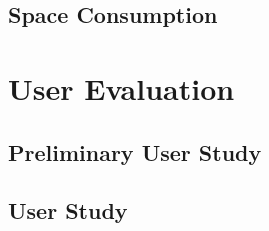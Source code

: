 \subsection{Space Consumption}

\section{User Evaluation}
\subsection{Preliminary User Study}
\subsection{User Study}